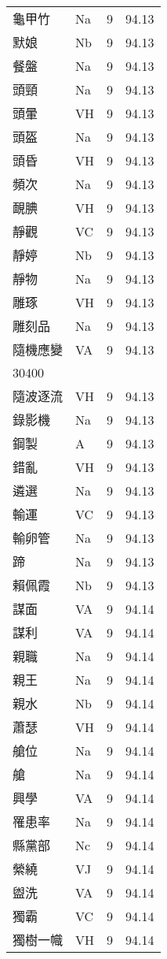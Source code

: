 \documentclass[twocolumn]{book}
\begin{document}
\begin{supertabular}{llrr}
龜甲竹 & Na & 9 &  94.13\\
默娘 & Nb & 9 &  94.13\\
餐盤 & Na & 9 &  94.13\\
頭頸 & Na & 9 &  94.13\\
頭暈 & VH & 9 &  94.13\\
頭盔 & Na & 9 &  94.13\\
頭昏 & VH & 9 &  94.13\\
頻次 & Na & 9 &  94.13\\
靦腆 & VH & 9 &  94.13\\
靜觀 & VC & 9 &  94.13\\
靜婷 & Nb & 9 &  94.13\\
靜物 & Na & 9 &  94.13\\
雕琢 & VH & 9 &  94.13\\
雕刻品 & Na & 9 &  94.13\\
隨機應變 & VA & 9 &  94.13\\
30400\\
隨波逐流 & VH & 9 &  94.13\\
錄影機 & Na & 9 &  94.13\\
鋼製 & A & 9 &  94.13\\
錯亂 & VH & 9 &  94.13\\
遴選 & Na & 9 &  94.13\\
輸運 & VC & 9 &  94.13\\
輸卵管 & Na & 9 &  94.13\\
蹄 & Na & 9 &  94.13\\
賴佩霞 & Nb & 9 &  94.13\\
謀面 & VA & 9 &  94.14\\
謀利 & VA & 9 &  94.14\\
親職 & Na & 9 &  94.14\\
親王 & Na & 9 &  94.14\\
親水 & Nb & 9 &  94.14\\
蕭瑟 & VH & 9 &  94.14\\
艙位 & Na & 9 &  94.14\\
艙 & Na & 9 &  94.14\\
興學 & VA & 9 &  94.14\\
罹患率 & Na & 9 &  94.14\\
縣黨部 & Nc & 9 &  94.14\\
縈繞 & VJ & 9 &  94.14\\
盥洗 & VA & 9 &  94.14\\
獨霸 & VC & 9 &  94.14\\
獨樹一幟 & VH & 9 &  94.14\\

\end{supertabular}
\end{document}
